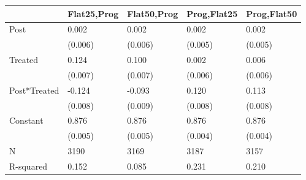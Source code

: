\begin{tabular}{lllll}
\toprule
 & Flat25,Prog & Flat50,Prog & Prog,Flat25 & Prog,Flat50 \\
\midrule
Post & 0.002 & 0.002 & 0.002 & 0.002 \\
 & (0.006) & (0.006) & (0.005) & (0.005) \\
Treated & 0.124 & 0.100 & 0.002 & 0.006 \\
 & (0.007) & (0.007) & (0.006) & (0.006) \\
Post*Treated & -0.124 & -0.093 & 0.120 & 0.113 \\
 & (0.008) & (0.009) & (0.008) & (0.008) \\
Constant & 0.876 & 0.876 & 0.876 & 0.876 \\
 & (0.005) & (0.005) & (0.004) & (0.004) \\
N & 3190 & 3169 & 3187 & 3157 \\
R-squared & 0.152 & 0.085 & 0.231 & 0.210 \\
\bottomrule
\end{tabular}
